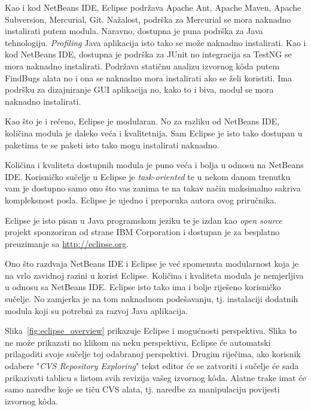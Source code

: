 Kao i kod NetBeans IDE, Eclipse podržava Apache Ant, Apache Maven, Apache Subversion, Mercurial, Git. Nažalost, podrška za Mercurial se mora naknadno instalirati putem modula. Naravno, dostupna je puna podrška za Java tehnologiju. \emph{Profiling} Java aplikacija isto tako se može naknadno instalirati. Kao i kod NetBeans IDE, dostupna je podrška za JUnit no integracija sa TestNG se mora naknadno instalirati. Podržava statičnu analizu izvornog kôda putem FindBugs alata no i ona se naknadno mora instalirati ako se želi koristiti. Ima podršku za dizajniranje GUI aplikacija no, kako to i biva, modul se mora naknadno instalirati.

Kao što je i rečeno, Eclipse je modularan. No za razliku od NetBeans IDE, količina modula je daleko veća i kvalitetnija. Sam Eclipse je isto tako dostupan u paketima te se paketi isto tako mogu instalirati naknadno.

\begin{infobox}
    Količina i kvaliteta dostupnih modula je puno veća i bolja u odnosu na NetBeans IDE. Korisničko sučelje u Eclipse je \emph{task-oriented} te u nekom danom trenutku vam je dostupno samo ono što vas zanima te na takav način maksimalno sakriva kompleksnost posla. Eclipse je ujedno i preporuka autora ovog priručnika.
\end{infobox}

Eclipse je isto pisan u Java programskom jeziku te je izdan kao \emph{open source} projekt sponzoriran od strane IBM Corporation i dostupan je za besplatno preuzimanje sa \url{http://eclipse.org}.

Ono što razdvaja NetBeans IDE i Eclipse je već spomenuta modularnost koja je na vrlo zavidnoj razini u korist Eclipse. Količina i kvaliteta modula je nemjerljiva u odnosu sa NetBeans IDE. Eclipse isto tako ima i bolje riješeno korisničko sučelje. No zamjerka je na tom naknadnom podešavanju, tj. instalaciji dodatnih modula koji su potrebni za razvoj Java aplikacija.

Slika~\ref{fig:eclipse_overview} prikazuje Eclipse i mogućnosti perspektiva. Slika to ne može prikazati no klikom na neku perspektivu, Eclipse će automatski prilagoditi svoje sučelje toj odabranoj perspektivi. Drugim riječima, ako korisnik odabere "\emph{CVS Repository Exploring}" tekst editor će se zatvoriti i sučelje će sada prikazivati tablicu s listom svih revizija vašeg izvornog kôda. Alatne trake imat će samo naredbe koje se tiču CVS alata, tj. naredbe za manipulaciju povijesti izvornog kôda.

